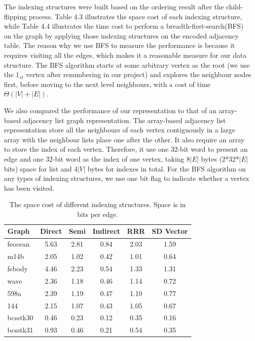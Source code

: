 \documentclass[12pt,glossary]{dalthesis}
\begin{document}
\bigskip
The indexing structures were built based on the ordering result after the child-flipping process. Table 4.3 illustrates the space cost of each indexing structure, while Table 4.4 illustrates the time cost to perform a breadth-first-search(BFS) on the graph by applying those indexing structures on the encoded adjacency table. The reason why we use BFS to measure the performance is because it requires visiting all the edges, which makes it a reasonable measure for our data structure. The BFS algorithm starts at some arbitrary vertex as the root (we use the $1_{st}$ vertex after renumbering in our project) and explores the neighbour nodes first, before moving to the next level neighbours, with a cost of time $\Theta(|V| + |E|)$. 

\bigskip
\bigskip

We also compared the performance of our representation to that of an array-based adjacency list graph representation. The array-based adjacency list representation store all the neighbours of each vertex contiguously in a large array with the neighbour lists place one after the other. It also require an array to store the index of each vertex. Therefore, it use one 32-bit word to present an edge and one 32-bit word as the index of one vertex, taking 8$|E|$ bytes (2*32*$|E|$ bits) space for list and 4$|V|$ bytes for indexes in total. For the BFS algorithm on any types of indexing structures, we use one bit flag to indicate whether a vertex has been visited.
\bigskip     

\begin{table}[ht]
\centering
\caption{The space cost of different indexing structures. Space is in bits per edge.}
\label{my-label}
\begin{tabular}{|l||c||c||c||c||c|}
\hline
Graph    & Direct & Semi & Indirect & RRR & SD Vector \\ \hline
feocean  &    5.63    &   2.81   &     0.84     &  2.03   &   1.59        \\
m14b     &    2.05    &   1.02   &    0.42      &  1.01   &   0.64        \\
febody   &    4.46   &   2.23   &     0.54     &  1.33   &    1.31        \\
wave     &   2.36    &   1.18   &    0.46      &   1.14   &   0.72         \\
598a     &    2.39    &   1.19   &   0.47       &  1.10   &    0.77       \\
144      &    2.15   &   1.07   &    0.43      &  1.05    &   0.67          \\
bcsstk30 &   0.46   &   0.23   &      0.12    &   0.35   &   0.16        \\
bcsstk31 &   0.93   &   0.46   &     0.21     &  0.54   &   0.35        \\ \hline
\end{tabular}
\end{table}
\end{document}
